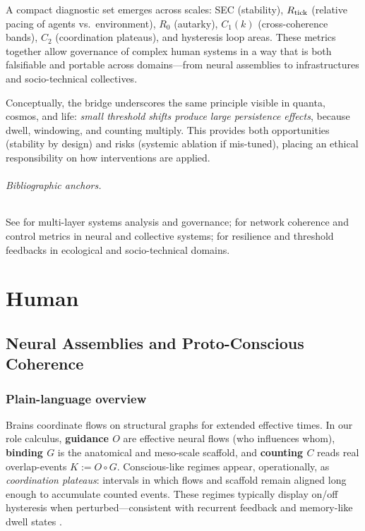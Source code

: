 \documentclass[12pt,a4paper,oneside]{scrreprt}
\begin{document}
A compact diagnostic set emerges across scales: SEC (stability), $R_{\rm tick}$ (relative pacing of agents vs.\ environment), $R_0$ (autarky), $C_1(k)$ (cross-coherence bands), $C_2$ (coordination plateaus), and hysteresis loop areas. 
These metrics together allow governance of complex human systems in a way that is both falsifiable and portable across domains—from neural assemblies to infrastructures and socio-technical collectives. 

Conceptually, the bridge underscores the same principle visible in quanta, cosmos, and life: 
\emph{small threshold shifts produce large persistence effects}, because dwell, windowing, and counting multiply. 
This provides both opportunities (stability by design) and risks (systemic ablation if mis-tuned), placing an ethical responsibility on how interventions are applied.

\paragraph{Bibliographic anchors.} 
See \cite{anderson1972more, ostrom2009understanding, helbing2013globally, kitano2004biological} for multi-layer systems analysis and governance; 
\cite{varshney2013structural, bassett2017network, barabasi2016network} for network coherence and control metrics in neural and collective systems; 
\cite{holling1973resilience, folke2010resilience} for resilience and threshold feedbacks in ecological and socio-technical domains.


\part{Human}

\chapter{Neural Assemblies and Proto-Conscious Coherence}\label{ch:human-neural}

\section*{Plain-language overview}
Brains coordinate flows on structural graphs for extended effective times. 
In our role calculus, \textbf{guidance $O$} are effective neural flows (who influences whom), \textbf{binding $G$} is the anatomical and meso-scale scaffold, and \textbf{counting $C$} reads real overlap-events $K:=O\!\circ G$. 
Conscious-like regimes appear, operationally, as \emph{coordination plateaus}: intervals in which flows and scaffold remain aligned long enough to accumulate counted events. These regimes typically display on/off hysteresis when perturbed---consistent with recurrent feedback and memory-like dwell states \cite{friston2016,tononi2008,sporns2013}.
\end{document}
